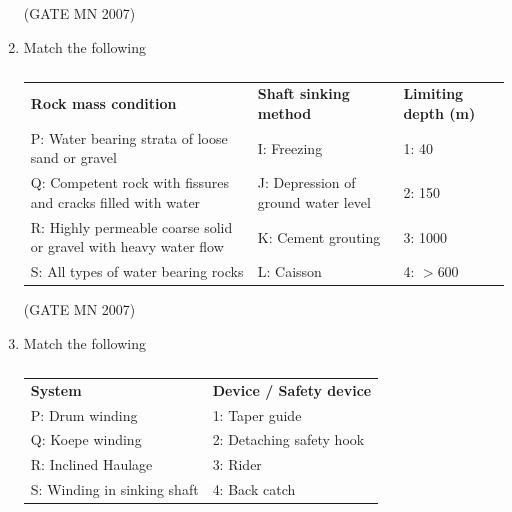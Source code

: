 \documentclass[journal]{IEEEtran}
\begin{document}
\begin{enumerate}
	\hfill (GATE MN 2007)
\begin{enumerate}
\end{enumerate}


\item Match the following
\begin{table}[H]
    \centering\normalsize
\begin{tabular}{p{4.5cm} p{4.5cm} p{4cm}}
\textbf{Rock mass condition} & \textbf{Shaft sinking method} & \textbf{Limiting depth (m)} \\
P: Water bearing strata of loose sand or gravel & I: Freezing & 1: 40 \\
Q: Competent rock with fissures and cracks filled with water & J: Depression of ground water level & 2: 150 \\
R: Highly permeable coarse solid or gravel with heavy water flow & K: Cement grouting & 3: 1000 \\
S: All types of water bearing rocks & L: Caisson & 4: $>$600 \\
\end{tabular}
\caption{}
    \label{tab:Q47}
\end{table}


\hfill (GATE MN 2007)
\begin{enumerate}
\end{enumerate}


\item Match the following
\begin{table}[H]
    \centering\normalsize
\begin{tabular}{p{4.5cm} p{6cm}}
\textbf{System} & \textbf{Device / Safety device} \\
P: Drum winding & 1: Taper guide \\
Q: Koepe winding & 2: Detaching safety hook \\
R: Inclined Haulage & 3: Rider \\
S: Winding in sinking shaft & 4: Back catch \\
\end{tabular}
\caption{}
    \label{tab:Q48}
\end{table}



\end{enumerate}
\end{document}
